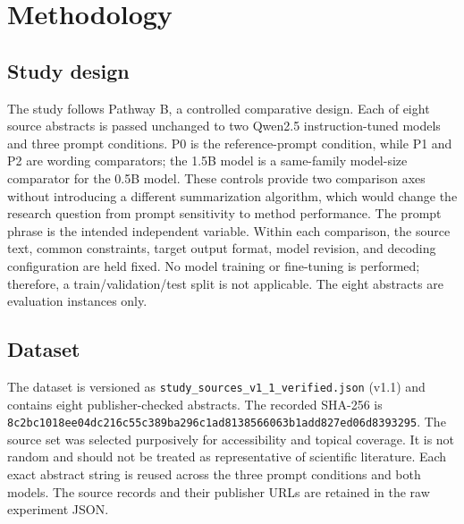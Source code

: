 \documentclass[acmsmall,screen,nonacm]{acmart}
\begin{document}
\section{Methodology}
\subsection{Study design}
The study follows Pathway B, a controlled comparative design. Each of eight source abstracts is passed unchanged to two Qwen2.5 instruction-tuned models and three prompt conditions. P0 is the reference-prompt condition, while P1 and P2 are wording comparators; the 1.5B model is a same-family model-size comparator for the 0.5B model. These controls provide two comparison axes without introducing a different summarization algorithm, which would change the research question from prompt sensitivity to method performance. The prompt phrase is the intended independent variable. Within each comparison, the source text, common constraints, target output format, model revision, and decoding configuration are held fixed. No model training or fine-tuning is performed; therefore, a train/validation/test split is not applicable. The eight abstracts are evaluation instances only.

\subsection{Dataset}
The dataset is versioned as \texttt{study\_sources\_v1\_1\_verified.json} (v1.1) and contains eight publisher-checked abstracts. The recorded SHA-256 is \texttt{8c2bc1018ee04dc2}\allowbreak\texttt{16c55c389ba296c1}\allowbreak\texttt{ad8138566063b1ad}\allowbreak\texttt{d827ed06d8393295}. The source set was selected purposively for accessibility and topical coverage. It is not random and should not be treated as representative of scientific literature. Each exact abstract string is reused across the three prompt conditions and both models. The source records and their publisher URLs are retained in the raw experiment JSON.
\end{document}
